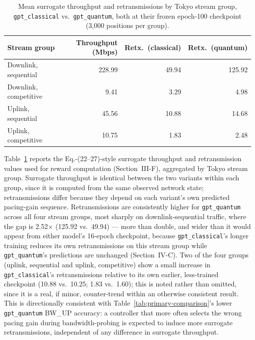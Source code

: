 \begin{table}[!t]
\caption{Mean surrogate throughput and retransmissions by Tokyo stream group, \texttt{gpt\_classical} vs.\ \texttt{gpt\_quantum}, both at their frozen epoch-100 checkpoint (3{,}000 positions per group).}
\label{tab:surrogate-throughput}
\centering
\begin{tabular}{lrrr}
\hline
Stream group & Throughput (Mbps) & Retx.\ (classical) & Retx.\ (quantum) \\
\hline
Downlink, sequential   & 228.99 & 49.94 & 125.92 \\
Downlink, competitive  & 9.41   & 3.29  & 4.98 \\
Uplink, sequential     & 45.56  & 10.88 & 14.68 \\
Uplink, competitive    & 10.75  & 1.83  & 2.48 \\
\hline
\end{tabular}
\end{table}

Table~\ref{tab:surrogate-throughput} reports the Eq.-(22--27)-style surrogate throughput and retransmission values used for reward computation (Section~III-F), aggregated by Tokyo stream group. Surrogate throughput is identical between the two variants within each group, since it is computed from the same observed network state; retransmissions differ because they depend on each variant's own predicted pacing-gain sequence. Retransmissions are consistently higher for \texttt{gpt\_quantum} across all four stream groups, most sharply on downlink-sequential traffic, where the gap is 2.52$\times$ (125.92 vs.\ 49.94) --- more than double, and wider than it would appear from either model's 16-epoch checkpoint, because \texttt{gpt\_classical}'s longer training reduces its own retransmissions on this stream group while \texttt{gpt\_quantum}'s predictions are unchanged (Section~IV-C). Two of the four groups (uplink, sequential and uplink, competitive) show a small increase in \texttt{gpt\_classical}'s retransmissions relative to its own earlier, less-trained checkpoint (10.88 vs.\ 10.25; 1.83 vs.\ 1.60); this is noted rather than omitted, since it is a real, if minor, counter-trend within an otherwise consistent result. This is directionally consistent with Table~\ref{tab:primary-comparison}'s lower \texttt{gpt\_quantum} BW\_UP accuracy: a controller that more often selects the wrong pacing gain during bandwidth-probing is expected to induce more surrogate retransmissions, independent of any difference in surrogate throughput.

